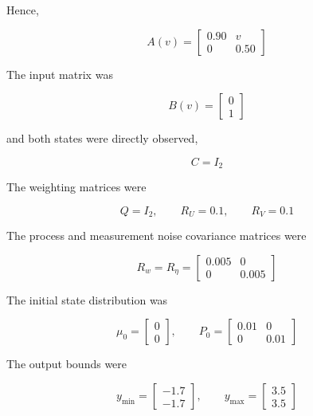 Hence,

\begin{equation}
    A(v)
    =
    \begin{bmatrix}
        0.90 & v\\
        0 & 0.50
    \end{bmatrix}
\end{equation}

The input matrix was

\begin{equation}
    B(v)
    =
    \begin{bmatrix}
        0\\
        1
    \end{bmatrix}
\end{equation}

and both states were directly observed,

\begin{equation}
    C=I_2
\end{equation}

The weighting matrices were

\begin{equation}
    Q=I_2,
    \qquad
    R_U=0.1,
    \qquad
    R_V=0.1
\end{equation}

The process and measurement noise covariance matrices were

\begin{equation}
    R_w
    =
    R_\eta
    =
    \begin{bmatrix}
        0.005 & 0\\
        0 & 0.005
    \end{bmatrix}
\end{equation}

The initial state distribution was

\begin{equation}
    \mu_0=
    \begin{bmatrix}
        0\\
        0
    \end{bmatrix},
    \qquad
    P_0=
    \begin{bmatrix}
        0.01 & 0\\
        0 & 0.01
    \end{bmatrix}
\end{equation}

The output bounds were

\begin{equation}
    y_{\min}
    =
    \begin{bmatrix}
        -1.7\\
        -1.7
    \end{bmatrix},
    \qquad
    y_{\max}
    =
    \begin{bmatrix}
        3.5\\
        3.5
    \end{bmatrix}
\end{equation}

